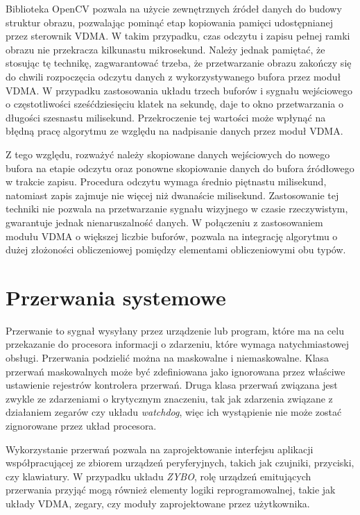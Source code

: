 Biblioteka OpenCV pozwala na użycie zewnętrznych źródeł danych do budowy struktur obrazu, pozwalając pominąć etap kopiowania pamięci udostępnianej przez sterownik VDMA. W takim przypadku, czas odczytu i zapisu pełnej ramki obrazu nie przekracza kilkunastu mikrosekund. Należy jednak pamiętać, że stosując tę technikę, zagwarantować trzeba, że przetwarzanie obrazu zakończy się do chwili rozpoczęcia odczytu danych z wykorzystywanego bufora przez moduł VDMA. W przypadku zastosowania układu trzech buforów i sygnału wejściowego o częstotliwości sześćdziesięciu klatek na sekundę, daje to okno przetwarzania o długości szesnastu milisekund. Przekroczenie tej wartości może wpłynąć na błędną pracę algorytmu ze względu na nadpisanie danych przez moduł VDMA.

Z tego względu, rozważyć należy skopiowane danych wejściowych do nowego bufora na etapie odczytu oraz ponowne skopiowanie danych do bufora źródłowego w trakcie zapisu. Procedura odczytu wymaga średnio piętnastu milisekund, natomiast zapis zajmuje nie więcej niż dwanaście milisekund. Zastosowanie tej techniki nie pozwala na przetwarzanie sygnału wizyjnego w czasie rzeczywistym, gwarantuje jednak nienaruszalność danych. W połączeniu z zastosowaniem modułu VDMA o większej liczbie buforów, pozwala na integrację algorytmu o dużej złożoności obliczeniowej pomiędzy elementami obliczeniowymi obu typów.

\section{Przerwania systemowe}
\label{sec:axi-interrupts}
Przerwanie to sygnał wysyłany przez urządzenie lub program, które ma na celu przekazanie do procesora informacji o zdarzeniu, które wymaga natychmiastowej obsługi.
Przerwania podzielić można na maskowalne i niemaskowalne. Klasa przerwań maskowalnych może być zdefiniowana jako ignorowana przez właściwe ustawienie rejestrów kontrolera przerwań. Druga klasa przerwań związana jest zwykle ze zdarzeniami o krytycznym znaczeniu, tak jak zdarzenia związane z działaniem zegarów czy układu \emph{watchdog}, więc ich wystąpienie nie może zostać zignorowane przez układ procesora.

Wykorzystanie przerwań pozwala na zaprojektowanie interfejsu aplikacji współpracującej ze zbiorem urządzeń peryferyjnych, takich jak czujniki, przyciski, czy klawiatury. W przypadku układu \emph{ZYBO}, rolę urządzeń emitujących przerwania przyjąć mogą również elementy logiki reprogramowalnej, takie jak układy VDMA, zegary, czy moduły zaprojektowane przez użytkownika.

